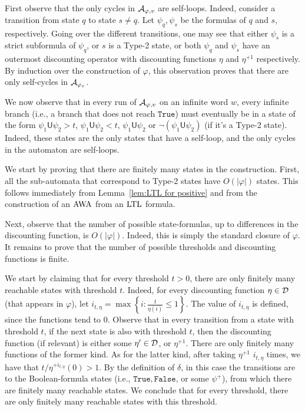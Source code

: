 \documentclass{llncs}
\newcommand{\set}[1]{{\left\{#1\right\}}}
\newcommand{\True}{\mathtt{True}}
\newcommand{\False}{\mathtt{False}}
\newcommand{\LTL}{{\ensuremath{\rm LTL}}\xspace}
\newcommand{\Until}{\mathsf{U}}
\newcommand{\AWW}{\mbox{\rm AWA}\xspace}
\newcommand{\D}{{\cal D}}
\newcommand{\A}{{\cal A}}
\renewcommand{\phi}{\varphi}
\newcommand{\df}{\eta}
\newcommand{\pos}[1]{{#1}^{+}}
\begin{document}
First observe that the only cycles in $\A_{\phi,v}$ are self-loops. Indeed, consider a transition from state $q$ to state $s\neq q$. Let $\psi_q,\psi_s$ be the formulas of $q$ and $s$, respectively.
Going over the different transitions, one may see that either $\psi_s$ is a strict subformula of $\psi_q$, or $s$ is a Type-2 state, or both $\psi_q$ and $\psi_s$ have an outermost discounting operator with discounting functions $\df$ and $\df^{+1}$ respectively. By induction over the construction of $\phi$, this observation proves that there are only self-cycles in $\A_{\phi_v}$.

We now observe that in every run of $\A_{\phi,v}$ on an infinite word $w$, every infinite branch (i.e., a branch that does not reach $\True$) must eventually be in a state of the form $\psi_1\Until\psi_2>t$, $\psi_1\Until\psi_2<t$, $\psi_1\Until\psi_2$ or $\neg(\psi_1\Until\psi_2)$ (if it's a Type-2 state). Indeed, these states are the only states that have a self-loop, and the only cycles in the automaton are self-loops.

We start by proving that there are finitely many states in the construction. First, all the sub-automata that correspond to Type-2 states have $O(|\varphi|)$ states. This follows immediately from Lemma~\ref{lem:LTL for positive} and from the construction of an $\AWW$ from an $\LTL$ formula.

Next, observe that the number of possible state-formulas, up to differences in the discounting function, is $O(|\phi|)$. Indeed, this is simply the standard closure of $\phi$. It remains to prove that the number of possible thresholds and discounting functions is finite.

We start by claiming that for every threshold $t>0$, there are only finitely many reachable states with threshold $t$. Indeed, for every discounting function $\df\in \D$ (that appears in $\phi$), let $i_{t,\df}=\max\set{i: \frac{t}{\df(i)}\le 1}$. The value of $i_{t,\df}$ is defined, since the functions tend to $0$. Observe that in every transition from a state with threshold $t$, if the next state is also with threshold $t$, then the discounting function (if relevant) is either some $\df'\in \D$, or $\df^{+1}$. There are only finitely many functions of the former kind. As for the latter kind, after taking $\df^{+1}$ $i_{t,\df}$ times, we have that $t/\df^{+i_{t,\df}}(0)>1$. By the definition of $\delta$, in this case the transitions are to the Boolean-formula states (i.e., $\True,\False$, or some $\pos{\psi}$), from which there are finitely many reachable states. We conclude that for every threshold, there are only finitely many reachable states with this threshold.
\end{document}
